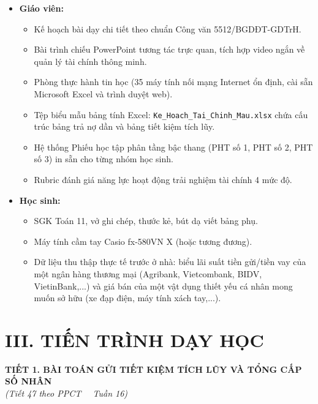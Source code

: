 \documentclass[12pt, a4paper]{article}
\begin{document}
\begin{itemize}[leftmargin=1.2cm]
    \item \textbf{Giáo viên:}
    \begin{itemize}[leftmargin=0.6cm]
        \item Kế hoạch bài dạy chi tiết theo chuẩn Công văn 5512/BGDĐT-GDTrH.
        \item Bài trình chiếu PowerPoint tương tác trực quan, tích hợp video ngắn về quản lý tài chính thông minh.
        \item Phòng thực hành tin học (35 máy tính nối mạng Internet ổn định, cài sẵn Microsoft Excel và trình duyệt web).
        \item Tệp biểu mẫu bảng tính Excel: \texttt{Ke\_Hoach\_Tai\_Chinh\_Mau.xlsx} chứa cấu trúc bảng trả nợ dần và bảng tiết kiệm tích lũy.
        \item Hệ thống Phiếu học tập phân tầng bậc thang (PHT số 1, PHT số 2, PHT số 3) in sẵn cho từng nhóm học sinh.
        \item Rubric đánh giá năng lực hoạt động trải nghiệm tài chính 4 mức độ.
    \end{itemize}

    \item \textbf{Học sinh:}
    \begin{itemize}[leftmargin=0.6cm]
        \item SGK Toán 11, vở ghi chép, thước kẻ, bút dạ viết bảng phụ.
        \item Máy tính cầm tay Casio fx-580VN X (hoặc tương đương).
        \item Dữ liệu thu thập thực tế trước ở nhà: biểu lãi suất tiền gửi/tiền vay của một ngân hàng thương mại (Agribank, Vietcombank, BIDV, VietinBank,...) và giá bán của một vật dụng thiết yếu cá nhân mong muốn sở hữu (xe đạp điện, máy tính xách tay,...).
    \end{itemize}
\end{itemize}

\vspace{5pt}

\section*{III. TIẾN TRÌNH DẠY HỌC}

\begin{center}
    {\fontsize{13pt}{16pt}\selectfont \textbf{TIẾT 1. BÀI TOÁN GỬI TIẾT KIỆM TÍCH LŨY VÀ TỔNG CẤP SỐ NHÂN}}\\[2pt]
    \textit{(Tiết 47 theo PPCT \ \textbar \ Tuần 16)}
\end{center}
\end{document}

